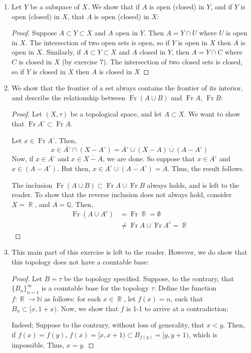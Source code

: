 \documentclass{book}
\DeclareMathOperator*{\R}{\mathbb{R}}
\DeclareMathOperator*{\Ft}{\text{Fr}}
\begin{document}
\begin{enumerate}[(1)]
    \item Let $Y$ be a subspace of $X$. We show that if $A$ is open (closed) in $Y$, and if $Y$ is open (closed) in $X$, that $A$ is open (closed) in $X$: 
        \begin{proof} Suppose $A\subset Y\subset X$ and $A$ open in $Y$.  Then $A=Y\cap U$ where $U$ is open in $X$.  The intersection of two open sets is open, so if $Y$ is open in $X$ then $A$ is open in $X$.  Similarly, if $A\subset Y\subset X$ and $A$ closed in $Y$, then $A=Y\cap C$ where $C$ is closed in $X$ (by exercise $7$).  The intersection of two closed sets is closed, so if $Y$ is closed in $X$ then $A$ is closed in $X$
        \end{proof}

    \item We show that the frontier of a set always contains the frontier of its interior, and describe the relationship between $\Ft (A \cup B)$ and $\Ft A$, $\Ft B$: 
        \begin{proof} Let $(X, \tau)$ be a topological space, and let $A \subset X$. We want to show that $\Ft A^\circ \subset \Ft A$. 
            \par Let $x \in \Ft A^\circ$. Then, 
            \[ x \in \overline{A^\circ} \cap \overline{(X - A^\circ)} = \overline{A^\circ} \cup \overline{(X-A) \cup (A - A^\circ)}\]
            Now, if $x \in \overline{A^\circ}$ and $x \in \overline{X -A}$, we are done. So suppose that $x \in \overline{A^\circ}$ and $x \in \overline{(A - A^\circ)}$. But then, $x \in \overline{A^\circ} \cup \overline{(A - A^\circ)} = \overline{A}$. Thus, the result follows.
            \newline \par 
            The inclusion $\Ft (A \cup B) \subset \Ft A \cup \Ft B$ always holds, and is left to the reader. To show that the reverse inclusion does not always hold, consider $X = \R$, and $A = \mathbb{Q}$. Then,
            \begin{align*}
                \Ft (A \cup A^c) & = \Ft \R = \emptyset \\
                & \neq \Ft A \cup \Ft A^c  = \R 
            \end{align*}
        \end{proof}

    \item This main part of this exercise is left to the reader. However, we do show that this topology does not have a countable base: 
        \begin{proof} Let $B = \tau$ be the topology specified. Suppose, to the contrary, that $\{B_n\}_{n = 1}^\infty$ is a countable base for the topology $\tau$. Define the function $f: \R \rightarrow \mathbb{N}$ as follows: for each $x \in \R$, let $f(x) = n$, such that $B_n \subset [x,1+x)$. Now, we show that $f$ is 1-1 to arrive at a contradiction: 
            \par Indeed; Suppose to the contrary, without loss of generality, that $x < y$. Then, if $f(x) = f(y)$, $f(x) = [x, x+1) \subset B_{f(y)} = [y, y+1)$, which is impossible. Thus, $x = y$. 
        \end{proof}


\end{enumerate}
\end{document}
